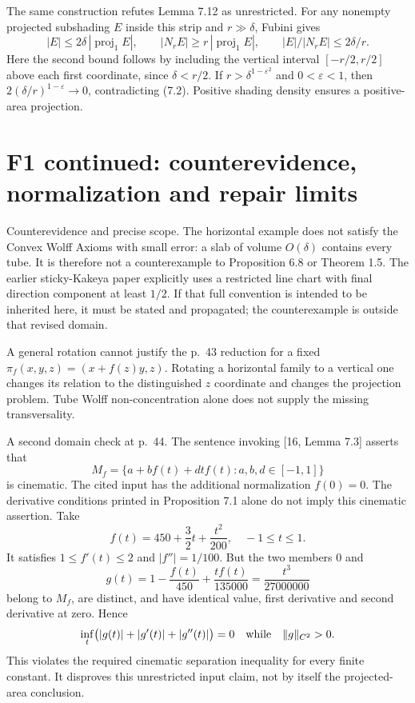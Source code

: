 \documentclass[10pt]{article}
\begin{document}
The same construction refutes Lemma 7.12 as unrestricted. For any nonempty projected subshading \(E\) inside this strip and \(r\gg\delta\), Fubini gives \[|E|\leq 2\delta\,|\operatorname{proj}_1E|,
 \qquad |N_rE|\geq r\,|\operatorname{proj}_1E|,
 \qquad |E|/|N_rE|\leq2\delta/r.\] Here the second bound follows by including the vertical interval \([-r/2,r/2]\) above each first coordinate, since \(\delta<r/2\). If \(r>\delta^{1-\varepsilon^2}\) and \(0<\varepsilon<1\), then \(2(\delta/r)^{1-\varepsilon}\to0\), contradicting (7.2). Positive shading density ensures a positive-area projection.\par
\section*{F1 continued: counterevidence, normalization and repair limits}
Counterevidence and precise scope. The horizontal example does not satisfy the Convex Wolff Axioms with small error: a slab of volume \(O(\delta)\) contains every tube. It is therefore not a counterexample to Proposition 6.8 or Theorem 1.5. The earlier sticky-Kakeya paper explicitly uses a restricted line chart with final direction component at least \(1/2\). If that full convention is intended to be inherited here, it must be stated and propagated; the counterexample is outside that revised domain.\par
A general rotation cannot justify the p. 43 reduction for a fixed \(\pi_f(x,y,z)=(x+f(z)y,z)\). Rotating a horizontal family to a vertical one changes its relation to the distinguished \(z\) coordinate and changes the projection problem. Tube Wolff non-concentration alone does not supply the missing transversality.\par
A second domain check at p. 44. The sentence invoking [16, Lemma 7.3] asserts that \[M_f=\{a+bf(t)+dtf(t):a,b,d\in[-1,1]\}\] is cinematic. The cited input has the additional normalization \(f(0)=0\). The derivative conditions printed in Proposition 7.1 alone do not imply this cinematic assertion. Take \[f(t)=450+\frac32t+\frac{t^2}{200},\quad -1\leq t\leq1.\] It satisfies \(1\leq f'(t)\leq2\) and \(|f''|=1/100\). But the two members \(0\) and \[g(t)=1-\frac{f(t)}{450}+\frac{tf(t)}{135000}
     =\frac{t^3}{27000000}\] belong to \(M_f\), are distinct, and have identical value, first derivative and second derivative at zero. Hence \[\inf_t\bigl(|g(t)|+|g'(t)|+|g''(t)|\bigr)=0
 \quad\hbox{while}\quad \|g\|_{C^2}>0.\] This violates the required cinematic separation inequality for every finite constant. It disproves this unrestricted input claim, not by itself the projected-area conclusion.\par
\end{document}
